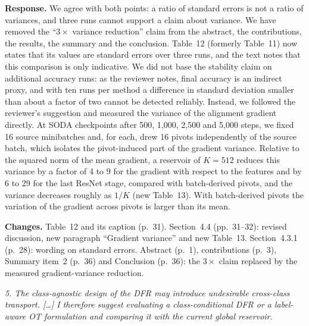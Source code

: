 \documentclass[11pt]{article}
\newenvironment{comment}{\par\medskip\noindent\begin{minipage}{\linewidth}\color{revcol}\itshape}{\end{minipage}\par\smallskip}
\newcommand{\resp}{\noindent\textbf{Response.} }
\newcommand{\chg}{\noindent\textbf{Changes.} }
\begin{document}
\resp We agree with both points: a ratio of standard errors is not a ratio of variances, and three runs cannot support a claim about variance. We have removed the ``$3\times$ variance reduction'' claim from the abstract, the contributions, the results, the summary and the conclusion. Table~12 (formerly Table~11) now states that its values are standard errors over three runs, and the text notes that this comparison is only indicative. We did not base the stability claim on additional accuracy runs: as the reviewer notes, final accuracy is an indirect proxy, and with ten runs per method a difference in standard deviation smaller than about a factor of two cannot be detected reliably. Instead, we followed the reviewer's suggestion and measured the variance of the alignment gradient directly. At SODA checkpoints after 500, 1,000, 2,500 and 5,000 steps, we fixed 16 source minibatches and, for each, drew 16 pivots independently of the source batch, which isolates the pivot-induced part of the gradient variance. Relative to the squared norm of the mean gradient, a reservoir of $K=512$ reduces this variance by a factor of 4 to 9 for the gradient with respect to the features and by 6 to 29 for the last ResNet stage, compared with batch-derived pivots, and the variance decreases roughly as $1/K$ (new Table~13). With batch-derived pivots the variation of the gradient across pivots is larger than its mean.

\chg Table~12 and its caption (p.~31). Section~4.4 (pp.~31--32): revised discussion, new paragraph ``Gradient variance'' and new Table~13. Section~4.3.1 (p.~28): wording on standard errors. Abstract (p.~1), contributions (p.~3), Summary item~2 (p.~36) and Conclusion (p.~36): the $3\times$ claim replaced by the measured gradient-variance reduction.

\begin{comment}
5. The class-agnostic design of the DFR may introduce undesirable cross-class transport. [\dots] I therefore suggest evaluating a class-conditional DFR or a label-aware OT formulation and comparing it with the current global reservoir.
\end{comment}
\end{document}
